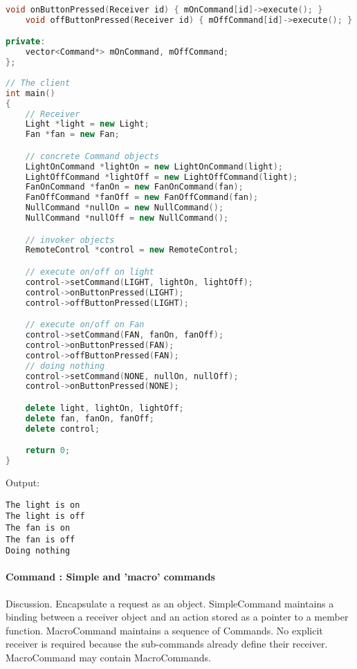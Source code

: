 \documentclass{book}
\begin{document}
\begin{lstlisting}[caption={Command pattern sample code 5, commandexample.cpp},label={lst:cm6},language=C++]
	void onButtonPressed(Receiver id) { mOnCommand[id]->execute(); } 
	void offButtonPressed(Receiver id) { mOffCommand[id]->execute(); } 

private:
	vector<Command*> mOnCommand, mOffCommand;
};
 
// The client
int main() 
{
	// Receiver 
	Light *light = new Light;
	Fan *fan = new Fan;

	// concrete Command objects 
	LightOnCommand *lightOn = new LightOnCommand(light);
	LightOffCommand *lightOff = new LightOffCommand(light);
	FanOnCommand *fanOn = new FanOnCommand(fan);
	FanOffCommand *fanOff = new FanOffCommand(fan);
	NullCommand *nullOn = new NullCommand();
	NullCommand *nullOff = new NullCommand();

	// invoker objects
	RemoteControl *control = new RemoteControl;

	// execute on/off on light
	control->setCommand(LIGHT, lightOn, lightOff);
	control->onButtonPressed(LIGHT);
	control->offButtonPressed(LIGHT);

	// execute on/off on Fan 
	control->setCommand(FAN, fanOn, fanOff);
	control->onButtonPressed(FAN);
	control->offButtonPressed(FAN);
    // doing nothing
	control->setCommand(NONE, nullOn, nullOff);
	control->onButtonPressed(NONE);

	delete light, lightOn, lightOff;
	delete fan, fanOn, fanOff;
	delete control;

	return 0;
}
\end{lstlisting}

Output:
\begin{verbatim}
The light is on
The light is off
The fan is on
The fan is off
Doing nothing
\end{verbatim}

\paragraph{Command : Simple and 'macro' commands}
Discussion. Encapsulate a request as an object. SimpleCommand maintains a binding between a receiver object and an action stored as a pointer to a member function.
MacroCommand maintains a sequence of Commands. No explicit receiver is required because the sub-commands already define their receiver. MacroCommand may contain MacroCommands.
\end{document}
